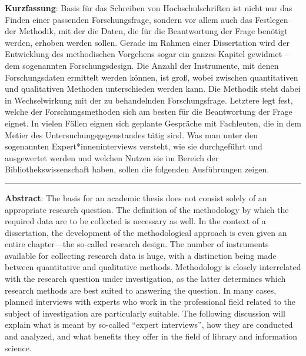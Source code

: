 \textbf{Kurzfassung}: Basis für das Schreiben von Hochschulschriften ist
nicht nur das Finden einer passenden Forschungsfrage, sondern vor allem
auch das Festlegen der Methodik, mit der die Daten, die für die
Beantwortung der Frage benötigt werden, erhoben werden sollen. Gerade im
Rahmen einer Dissertation wird der Entwicklung des methodischen
Vorgehens sogar ein ganzes Kapitel gewidmet -- dem sogenannten
Forschungsdesign. Die Anzahl der Instrumente, mit denen Forschungsdaten
ermittelt werden können, ist groß, wobei zwischen quantitativen und
qualitativen Methoden unterschieden werden kann. Die Methodik steht
dabei in Wechselwirkung mit der zu behandelnden Forschungsfrage.
Letztere legt fest, welche der Forschungsmethoden sich am besten für die
Beantwortung der Frage eignet. In vielen Fällen eignen sich geplante
Gespräche mit Fachleuten, die in dem Metier des
Untersuchungsgegenstandes tätig sind. Was man unter den sogenannten
Expert*inneninterviews versteht, wie sie durchgeführt und ausgewertet
werden und welchen Nutzen sie im Bereich der Bibliothekswissenschaft
haben, sollen die folgenden Ausführungen zeigen.

\begin{center}\rule{0.5\linewidth}{0.5pt}\end{center}

\noindent\textbf{Abstract}: The basis for an academic thesis does not consist
solely of an appropriate research question. The definition of the
methodology by which the required data are to be collected is necessary
as well. In the context of a dissertation, the development of the
methodological approach is even given an entire chapter---the so-called
research design. The number of instruments available for collecting
research data is huge, with a distinction being made between
quantitative and qualitative methods. Methodology is closely
interrelated with the research question under investigation, as the
latter determines which research methods are best suited to answering
the question. In many cases, planned interviews with experts who work in
the professional field related to the subject of investigation are
particularly suitable. The following discussion will explain what is
meant by so-called \enquote{expert interviews}, how they are conducted and
analyzed, and what benefits they offer in the field of library and
information science.
